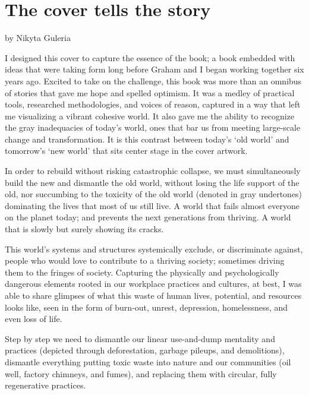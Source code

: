 ﻿\chapter{The cover tells the story}
\vspace{-2cm}
\begin{center} 
by Nikyta Guleria
\end{center}
\vspace{2cm}


I designed this cover to capture the essence of the book; a book embedded with ideas that were taking form long before Graham and I began working together six years ago. Excited to take on the challenge, this book was more than an omnibus of stories that gave me hope and spelled optimism. It was a medley of practical tools, researched methodologies, and voices of reason, captured in a way that left me visualizing a vibrant cohesive world. It also gave me the ability to recognize the gray inadequacies of today’s world, ones that bar us from meeting large-scale change and transformation. It is this contrast between today’s ‘old world’ and tomorrow’s ‘new world’ that sits center stage in the cover artwork.  


In order to rebuild without risking catastrophic collapse, we must simultaneously build the new and dismantle the old world, without losing the life support of the old, nor succumbing to the toxicity of the old world (denoted in gray undertones) dominating the lives that most of us still live. A world that fails almost everyone on the planet today; and prevents the next generations from thriving. A world that is slowly but surely showing its cracks. 


This world’s systems and structures systemically exclude, or discriminate against, people who would love to contribute to a thriving society; sometimes driving them to the fringes of society. Capturing the physically and psychologically dangerous elements rooted in our workplace practices and cultures, at best, I was able to share glimpses of what this waste of human lives, potential, and resources looks like, seen in the form of burn-out, unrest, depression, homelessness, and even loss of life.


Step by step we need to dismantle our linear use\hyp{}and\hyp{}dump mentality and practices (depicted through deforestation, garbage pileups, and demolitions), dismantle everything putting toxic waste into nature and our communities (oil well, factory chimneys, and fumes), and replacing them with circular, fully regenerative practices.



